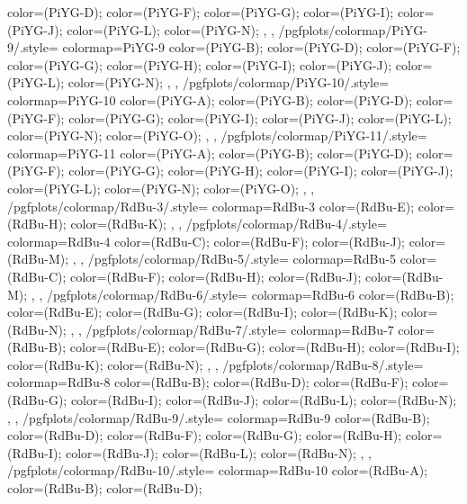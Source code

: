 {{{      color=(PiYG-D);
      color=(PiYG-F);
      color=(PiYG-G);
      color=(PiYG-I);
      color=(PiYG-J);
      color=(PiYG-L);
      color=(PiYG-N);
    },
  },
  /pgfplots/colormap/PiYG-9/.style={
    colormap={PiYG-9}{
      color=(PiYG-B);
      color=(PiYG-D);
      color=(PiYG-F);
      color=(PiYG-G);
      color=(PiYG-H);
      color=(PiYG-I);
      color=(PiYG-J);
      color=(PiYG-L);
      color=(PiYG-N);
    },
  },
  /pgfplots/colormap/PiYG-10/.style={
    colormap={PiYG-10}{
      color=(PiYG-A);
      color=(PiYG-B);
      color=(PiYG-D);
      color=(PiYG-F);
      color=(PiYG-G);
      color=(PiYG-I);
      color=(PiYG-J);
      color=(PiYG-L);
      color=(PiYG-N);
      color=(PiYG-O);
    },
  },
  /pgfplots/colormap/PiYG-11/.style={
    colormap={PiYG-11}{
      color=(PiYG-A);
      color=(PiYG-B);
      color=(PiYG-D);
      color=(PiYG-F);
      color=(PiYG-G);
      color=(PiYG-H);
      color=(PiYG-I);
      color=(PiYG-J);
      color=(PiYG-L);
      color=(PiYG-N);
      color=(PiYG-O);
    },
  },
  /pgfplots/colormap/RdBu-3/.style={
    colormap={RdBu-3}{
      color=(RdBu-E);
      color=(RdBu-H);
      color=(RdBu-K);
    },
  },
  /pgfplots/colormap/RdBu-4/.style={
    colormap={RdBu-4}{
      color=(RdBu-C);
      color=(RdBu-F);
      color=(RdBu-J);
      color=(RdBu-M);
    },
  },
  /pgfplots/colormap/RdBu-5/.style={
    colormap={RdBu-5}{
      color=(RdBu-C);
      color=(RdBu-F);
      color=(RdBu-H);
      color=(RdBu-J);
      color=(RdBu-M);
    },
  },
  /pgfplots/colormap/RdBu-6/.style={
    colormap={RdBu-6}{
      color=(RdBu-B);
      color=(RdBu-E);
      color=(RdBu-G);
      color=(RdBu-I);
      color=(RdBu-K);
      color=(RdBu-N);
    },
  },
  /pgfplots/colormap/RdBu-7/.style={
    colormap={RdBu-7}{
      color=(RdBu-B);
      color=(RdBu-E);
      color=(RdBu-G);
      color=(RdBu-H);
      color=(RdBu-I);
      color=(RdBu-K);
      color=(RdBu-N);
    },
  },
  /pgfplots/colormap/RdBu-8/.style={
    colormap={RdBu-8}{
      color=(RdBu-B);
      color=(RdBu-D);
      color=(RdBu-F);
      color=(RdBu-G);
      color=(RdBu-I);
      color=(RdBu-J);
      color=(RdBu-L);
      color=(RdBu-N);
    },
  },
  /pgfplots/colormap/RdBu-9/.style={
    colormap={RdBu-9}{
      color=(RdBu-B);
      color=(RdBu-D);
      color=(RdBu-F);
      color=(RdBu-G);
      color=(RdBu-H);
      color=(RdBu-I);
      color=(RdBu-J);
      color=(RdBu-L);
      color=(RdBu-N);
    },
  },
  /pgfplots/colormap/RdBu-10/.style={
    colormap={RdBu-10}{
      color=(RdBu-A);
      color=(RdBu-B);
      color=(RdBu-D);
}}}

